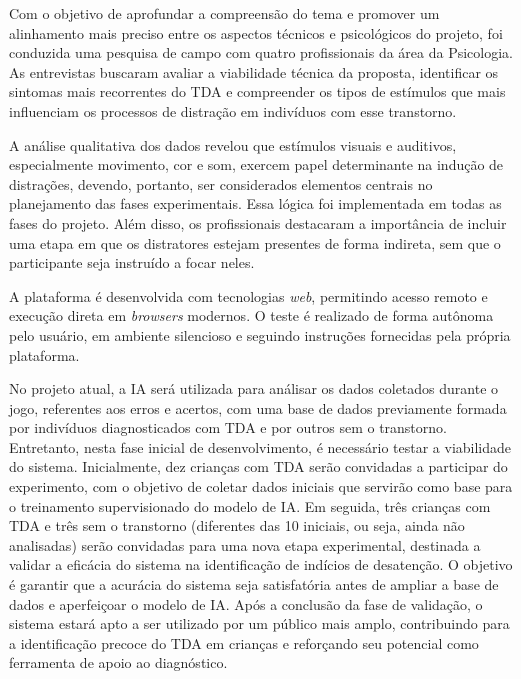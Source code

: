 Com o objetivo de aprofundar a compreensão do tema e promover um alinhamento mais preciso entre os aspectos técnicos e psicológicos do projeto, foi conduzida uma pesquisa de campo com quatro profissionais da área da Psicologia. As entrevistas buscaram avaliar a viabilidade técnica da proposta, identificar os sintomas mais recorrentes do TDA e compreender os tipos de estímulos que mais influenciam os processos de distração em indivíduos com esse transtorno.

A análise qualitativa dos dados revelou que estímulos visuais e auditivos, especialmente movimento, cor e som, exercem papel determinante na indução de distrações, devendo, portanto, ser considerados elementos centrais no planejamento das fases experimentais. Essa lógica foi implementada em todas as fases do projeto.
Além disso, os profissionais destacaram a importância de incluir uma etapa em que os distratores estejam presentes de forma indireta, sem que o participante seja instruído a focar neles.

A plataforma é desenvolvida com tecnologias \textit{web}, permitindo acesso remoto e execução
direta em \textit{browsers} modernos. O teste é realizado de forma autônoma pelo usuário, em ambiente silencioso e seguindo instruções fornecidas pela própria plataforma.

No projeto atual, a IA será utilizada para análisar os dados coletados durante o jogo, referentes aos erros e acertos, com uma base de dados previamente formada por indivíduos diagnosticados com TDA e por outros sem o transtorno. Entretanto, nesta fase inicial de desenvolvimento, é necessário testar a viabilidade do sistema. Inicialmente, dez crianças com TDA serão convidadas a participar do experimento, com o objetivo de coletar dados iniciais que servirão como base para o treinamento supervisionado do modelo de IA. Em seguida, três crianças com TDA e três sem o transtorno (diferentes das 10 iniciais, ou seja, ainda não analisadas) 
serão convidadas para uma nova etapa experimental, destinada a validar a eficácia do sistema na identificação de indícios de desatenção. O objetivo é garantir que a acurácia do sistema seja satisfatória antes de ampliar a base de dados e aperfeiçoar o modelo de IA. Após a conclusão da fase de validação, o sistema estará apto a ser utilizado por um público mais amplo, contribuindo para a identificação precoce do TDA em crianças e reforçando seu potencial como ferramenta de apoio ao diagnóstico. 

